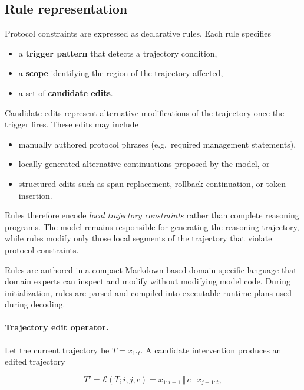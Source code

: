 \documentclass[twocolumn]{article}
\begin{document}
\subsection{Rule representation}

Protocol constraints are expressed as declarative rules. Each rule specifies

\begin{itemize}
  \item a \textbf{trigger pattern} that detects a trajectory condition,
  \item a \textbf{scope} identifying the region of the trajectory affected,
  \item a set of \textbf{candidate edits}.
\end{itemize}

Candidate edits represent alternative modifications of the trajectory once the
trigger fires. These edits may include

\begin{itemize}
  \item manually authored protocol phrases (e.g.\ required management
    statements),
  \item locally generated alternative continuations proposed by the model, or
  \item structured edits such as span replacement, rollback continuation, or
    token insertion.
\end{itemize}

Rules therefore encode \emph{local trajectory constraints} rather than complete
reasoning programs. The model remains responsible for generating the reasoning
trajectory, while rules modify only those local segments of the trajectory that
violate protocol constraints.

Rules are authored in a compact Markdown-based domain-specific language that
domain experts can inspect and modify without modifying model code. During
initialization, rules are parsed and compiled into executable runtime plans used
during decoding.

\paragraph{Trajectory edit operator.}

Let the current trajectory be $T = x_{1:t}$. A candidate intervention produces
an edited trajectory

\[
  T' = \mathcal{E}(T;i,j,c) =
  x_{1:i-1} \,\Vert\, c \,\Vert\, x_{j+1:t},
\]
\end{document}
